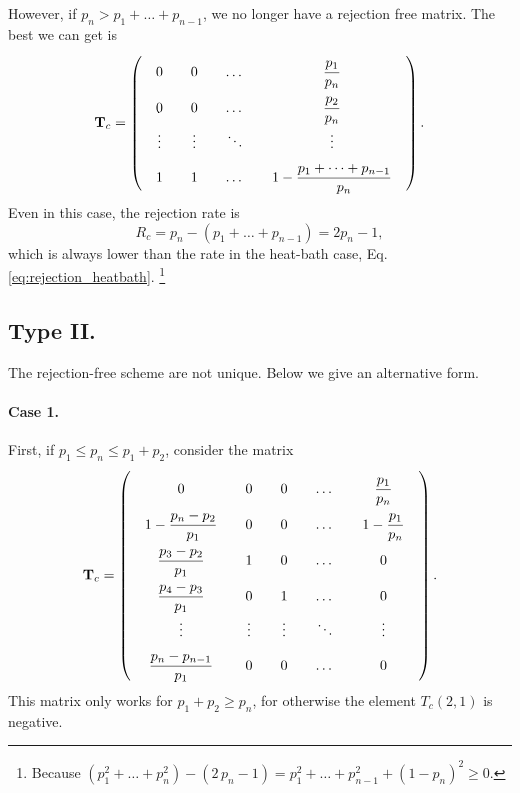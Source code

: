 \documentclass[12pt]{article}
\begin{document}
However, if $p_n > p_1 + \dots + p_{n-1}$, we no longer
have a rejection free matrix.  The best we can get is
\begin{equation}
  \mathbf T_{c}
=
\left(
  \arraycolsep=10.0pt\def\arraystretch{2.0}
  \begin{array}{cccccc}
    0     &   0   &   \dots  &   \dfrac{p_1}{p_n}       \\
    0     &   0   &   \dots  &   \dfrac{p_2}{p_n} \\
    \vdots&\vdots &   \ddots &   \vdots \\
    1 &  1 &   \dots  &   1 - \dfrac{p_1 + \cdots + p_{n-1}}{p_n} \\
  \end{array}
\right).
\label{eq:T_convective_n1}
\end{equation}
Even in this case,
the rejection rate is
\begin{equation}
R_c = p_n - (p_1 + \dots + p_{n-1}) = 2 p_n - 1,
\label{eq:rejection_convective}
\end{equation}
which is always lower than the rate
in the heat-bath case,
Eq. \eqref{eq:rejection_heatbath}.
\footnote{
  Because
  $(p_1^2 + \dots + p_n^2) -  (2 \, p_n - 1)
  = p_1^2 + \dots + p_{n-1}^2 + (1 - p_n)^2 \ge 0$.
}


\subsection{Type II.}

The rejection-free scheme are not unique.
%
Below we give an alternative form.

\paragraph{Case 1.}

First, if $p_1 \le p_n \le p_1+ p_2$,
consider the matrix
$$
  \mathbf T_{c}
=
\left(
  \arraycolsep=10.0pt\def\arraystretch{2.0}
  \begin{array}{cccccc}
    0     &   0   &   0   &   \dots  &   \dfrac{p_1}{p_n}       \\
    1-\dfrac{p_n - p_2}{p_1}   &   0   &   0   &   \dots  &   1 - \dfrac{p_1}{p_n} \\
    \dfrac{p_3 - p_2}{p_1}     &   1   &   0   &   \dots  &   0 \\
    \dfrac{p_4 - p_3}{p_1}     &   0   &   1   &   \dots  &   0 \\
    \vdots&\vdots &\vdots &   \ddots &   \vdots \\
    \dfrac{p_n - p_{n-1}}{p_1} &   0   &   0   &   \dots  &   0 \\
  \end{array}
\right).
$$
%
This matrix only works for $p_1 + p_2 \ge p_n$,
for otherwise the element $T_c(2,1)$ is negative.
\end{document}
